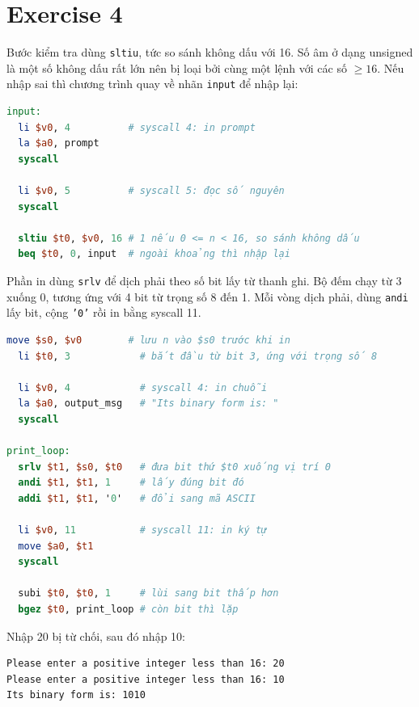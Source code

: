 \section{Exercise 4}

Bước kiểm tra dùng \texttt{sltiu}, tức so sánh không dấu với 16. Số âm ở dạng unsigned
là một số không dấu rất lớn nên bị loại bởi cùng một lệnh với các số $\geq 16$.
Nếu nhập sai thì chương trình quay về nhãn \texttt{input} để nhập lại:

\begin{lstlisting}[language=MIPS,numbers=none]
input:
  li $v0, 4          # syscall 4: in prompt
  la $a0, prompt
  syscall

  li $v0, 5          # syscall 5: đọc số nguyên
  syscall

  sltiu $t0, $v0, 16 # 1 nếu 0 <= n < 16, so sánh không dấu
  beq $t0, 0, input  # ngoài khoảng thì nhập lại
\end{lstlisting}

Phần in dùng \texttt{srlv} để dịch phải theo số bit lấy từ thanh ghi.
Bộ đếm chạy từ 3 xuống 0, tương ứng với 4 bit từ trọng số 8 đến 1.
Mỗi vòng dịch phải, dùng \texttt{andi} lấy bit, cộng \texttt{'0'} rồi in bằng syscall 11.

\begin{lstlisting}[language=MIPS,numbers=none]
  move $s0, $v0        # lưu n vào $s0 trước khi in
  li $t0, 3            # bắt đầu từ bit 3, ứng với trọng số 8

  li $v0, 4            # syscall 4: in chuỗi
  la $a0, output_msg   # "Its binary form is: "
  syscall

print_loop:
  srlv $t1, $s0, $t0   # đưa bit thứ $t0 xuống vị trí 0
  andi $t1, $t1, 1     # lấy đúng bit đó
  addi $t1, $t1, '0'   # đổi sang mã ASCII

  li $v0, 11           # syscall 11: in ký tự
  move $a0, $t1
  syscall

  subi $t0, $t0, 1     # lùi sang bit thấp hơn
  bgez $t0, print_loop # còn bit thì lặp
\end{lstlisting}

Nhập 20 bị từ chối, sau đó nhập 10:

\begin{lstlisting}[language={},numbers=none]
Please enter a positive integer less than 16: 20
Please enter a positive integer less than 16: 10
Its binary form is: 1010
\end{lstlisting}
